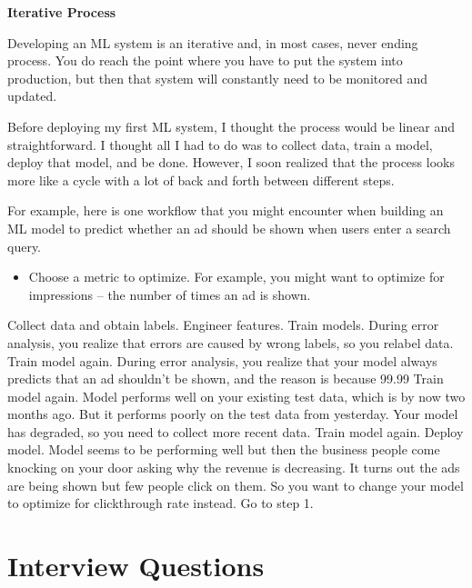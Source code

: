 \documentclass[openany]{book}
\begin{document}
\textbf{Iterative Process}


Developing an ML system is an iterative and, in most cases, never ending process. You do reach the point where you have to put the system into production, but then that system will constantly need to be monitored and updated.

Before deploying my first ML system, I thought the process would be linear and straightforward. I thought all I had to do was to collect data, train a model, deploy that model, and be done. However, I soon realized that the process looks more like a cycle with a lot of back and forth between different steps.

For example, here is one workflow that you might encounter when building an ML model to predict whether an ad should be shown when users enter a search query.



\begin{itemize}
    \item Choose a metric to optimize. For example, you might want to optimize for impressions -- the number of times an ad is shown.
\end{itemize}


Collect data and obtain labels.
Engineer features.
Train models.
During error analysis, you realize that errors are caused by wrong labels, so you relabel data.
Train model again.
During error analysis, you realize that your model always predicts that an ad shouldn’t be shown, and the reason is because 99.99%
Train model again.
Model performs well on your existing test data, which is by now two months ago. But it performs poorly on the test data from yesterday. Your model has degraded, so you need to collect more recent data.
Train model again.
Deploy model.
Model seems to be performing well but then the business people come knocking on your door asking why the revenue is decreasing. It turns out the ads are being shown but few people click on them. So you want to change your model to optimize for clickthrough rate instead.
Go to step 1.










\section{Interview Questions}
\end{document}
